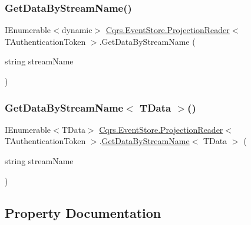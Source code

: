 \subsubsection{\texorpdfstring{Get\+Data\+By\+Stream\+Name()}{GetDataByStreamName()}}
{\footnotesize\ttfamily I\+Enumerable$<$dynamic$>$ \hyperlink{classCqrs_1_1EventStore_1_1ProjectionReader}{Cqrs.\+Event\+Store.\+Projection\+Reader}$<$ T\+Authentication\+Token $>$.Get\+Data\+By\+Stream\+Name (\begin{DoxyParamCaption}\item[{string}]{stream\+Name }\end{DoxyParamCaption})\hspace{0.3cm}{\ttfamily [protected]}}

\mbox{\label{classCqrs_1_1EventStore_1_1ProjectionReader_adb256fc2c761a0add40c84fe2c1cb6e8_adb256fc2c761a0add40c84fe2c1cb6e8}} 
\subsubsection{\texorpdfstring{Get\+Data\+By\+Stream\+Name$<$ T\+Data $>$()}{GetDataByStreamName< TData >()}}
{\footnotesize\ttfamily I\+Enumerable$<$T\+Data$>$ \hyperlink{classCqrs_1_1EventStore_1_1ProjectionReader}{Cqrs.\+Event\+Store.\+Projection\+Reader}$<$ T\+Authentication\+Token $>$.\hyperlink{classCqrs_1_1EventStore_1_1ProjectionReader_adcc229abde429acfa6b125b3a93a85b4_adcc229abde429acfa6b125b3a93a85b4}{Get\+Data\+By\+Stream\+Name}$<$ T\+Data $>$ (\begin{DoxyParamCaption}\item[{string}]{stream\+Name }\end{DoxyParamCaption})\hspace{0.3cm}{\ttfamily [protected]}}



\subsection{Property Documentation}
\mbox{\label{classCqrs_1_1EventStore_1_1ProjectionReader_a2c7ada08a9525c161eb7e42e2dbf55e0_a2c7ada08a9525c161eb7e42e2dbf55e0}} 
